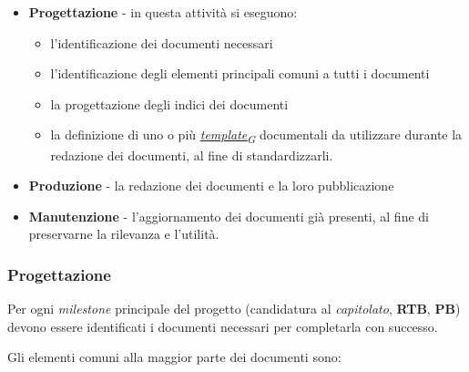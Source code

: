 \documentclass[12pt, a4paper]{article}
\newcommand{\urlglossario}{https://skynetunigroup.github.io/Code_Guardian/Documentazione/PB/glossario_v2.0.0.pdf} %
\newcommand{\glo}[2]{\href{\urlglossario\#nameddest=#2}{#1\textsubscript{G}}}
\begin{document}
\begin{itemize}
    \item \textbf{Progettazione} - in questa attività si eseguono:
    \begin{itemize}
        \item l'identificazione dei documenti necessari
        \item l'identificazione degli elementi principali comuni a tutti i documenti
        \item la progettazione degli indici dei documenti
        \item la definizione di uno o più \textit{\glo{template}{template}} documentali da utilizzare durante la redazione dei documenti, al fine di standardizzarli.
    \end{itemize}

    \item \textbf{Produzione} - la redazione dei documenti e la loro pubblicazione

    \item \textbf{Manutenzione} - l'aggiornamento dei documenti già presenti, al fine di preservarne la rilevanza e l'utilità.
\end{itemize}

\subsubsection{Progettazione}

Per ogni \textit{milestone} principale del progetto (candidatura al \textit{capitolato}, \textbf{RTB}, \textbf{PB}) devono essere identificati i documenti necessari per completarla con successo.

Gli elementi comuni alla maggior parte dei documenti sono: 
\end{document}

